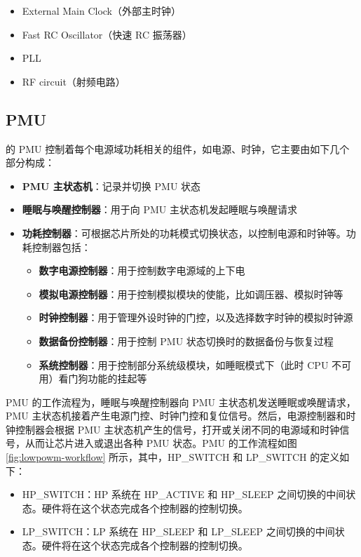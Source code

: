 \documentclass[main\_\_CN.tex]{subfiles}
\begin{document}
\begin{itemize}
    \item External Main Clock（外部主时钟）
    \item Fast RC Oscillator（快速 RC 振荡器）
    \item PLL
    \item RF circuit（射频电路）
\end{itemize}

\subsection{PMU}

\chipname{} 的 PMU 控制着每个电源域功耗相关的组件，如电源、时钟，它主要由如下几个部分构成：

\begin{itemize}
    \item \textbf{PMU 主状态机}：记录并切换 PMU 状态
    \item \textbf{睡眠与唤醒控制器}：用于向 PMU 主状态机发起睡眠与唤醒请求
    \item \textbf{功耗控制器}：可根据芯片所处的功耗模式切换状态，以控制电源和时钟等。功耗控制器包括：
        \begin{itemize}
            \item \textbf{数字电源控制器}：用于控制数字电源域的上下电
            \item \textbf{模拟电源控制器}：用于控制模拟模块的使能，比如调压器、模拟时钟等
            \item \textbf{时钟控制器}：用于管理外设时钟的门控，以及选择数字时钟的模拟时钟源
            \item \textbf{数据备份控制器}：用于控制 PMU 状态切换时的数据备份与恢复过程
            \item \textbf{系统控制器}：用于控制部分系统级模块，如睡眠模式下（此时 CPU 不可用）看门狗功能的挂起等
        \end{itemize}
\end{itemize}

PMU 的工作流程为，睡眠与唤醒控制器向 PMU 主状态机发送睡眠或唤醒请求，PMU 主状态机接着产生电源门控、时钟门控和复位信号。然后，电源控制器和时钟控制器会根据 PMU 主状态机产生的信号，打开或关闭不同的电源域和时钟信号，从而让芯片进入或退出各种 PMU 状态。PMU 的工作流程如图 \ref{fig:lowpowm-workflow} 所示，其中，HP\_SWITCH 和 LP\_SWITCH 的定义如下：

\begin{itemize}
    \item HP\_SWITCH：HP 系统在 HP\_ACTIVE 和 HP\_SLEEP 之间切换的中间状态。硬件将在这个状态完成各个控制器的控制切换。
    \item LP\_SWITCH：LP 系统在 HP\_SLEEP 和 LP\_SLEEP 之间切换的中间状态。硬件将在这个状态完成各个控制器的控制切换。
\end{itemize}
\end{document}

